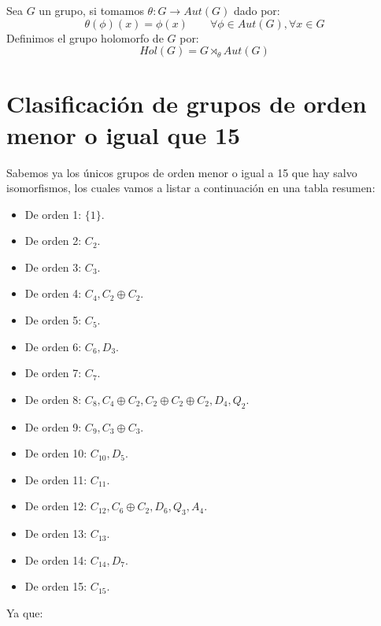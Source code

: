 \begin{definicion}
    Sea $G$ un grupo, si tomamos $\theta:G\to Aut(G)$ dado por:
    \begin{equation*}
        \theta(\phi)(x) = \phi(x) \qquad \forall \phi \in Aut(G), \forall x\in G
    \end{equation*}
    Definimos el grupo holomorfo de $G$ por:
    \begin{equation*}
        Hol(G) = G\rtimes_\theta Aut(G)
    \end{equation*}
\end{definicion}

\section{Clasificación de grupos de orden menor o igual que 15}
\noindent
Sabemos ya los únicos grupos de orden menor o igual a 15 que hay salvo isomorfismos, los cuales vamos a listar a continuación en una tabla resumen:
\begin{itemize}
    \item De orden 1: $\{1\}$.
    \item De orden 2: $C_2$.
    \item De orden 3: $C_3$.
    \item De orden 4: $C_4, C_2\oplus C_2$.
    \item De orden 5: $C_5$.
    \item De orden 6: $C_6, D_3$.
    \item De orden 7: $C_7$.
    \item De orden 8: $C_8, C_4\oplus C_2, C_2\oplus C_2\oplus C_2, D_4, Q_2$.
    \item De orden 9: $C_9, C_3\oplus C_3$.
    \item De orden 10: $C_{10}, D_5$.
    \item De orden 11: $C_{11}$.
    \item De orden 12: $C_{12}, C_6\oplus C_2, D_6, Q_3, A_4$.
    \item De orden 13: $C_{13}$.
    \item De orden 14: $C_{14}, D_7$.
    \item De orden 15: $C_{15}$.
\end{itemize}
Ya que:
